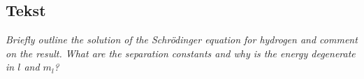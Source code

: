 \subsection{Tekst}

\emph{Briefly outline the solution of the Schrödinger equation for hydrogen and comment on the result. What are the separation constants and why is the energy degenerate in $l$ and $m_l$?}